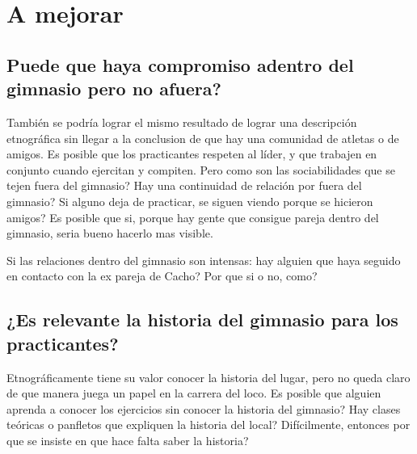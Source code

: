 
\section{A mejorar}\label{a-mejorar}



\subsection{Puede que haya compromiso adentro del gimnasio pero no
afuera?}\label{puede-que-haya-compromiso-adentro-del-gimnasio-pero-no-afuera}

También se podría lograr el mismo resultado de lograr una descripción
etnográfica sin llegar a la conclusion de que hay una comunidad de
atletas o de amigos. Es posible que los practicantes respeten al líder,
y que trabajen en conjunto cuando ejercitan y compiten. Pero como son
las sociabilidades que se tejen fuera del gimnasio? Hay una continuidad
de relación por fuera del gimnasio? Si alguno deja de practicar, se
siguen viendo porque se hicieron amigos? Es posible que si, porque hay
gente que consigue pareja dentro del gimnasio, seria bueno hacerlo mas
visible.

Si las relaciones dentro del gimnasio son intensas: hay alguien que haya
seguido en contacto con la ex pareja de Cacho? Por que si o no, como?

\subsection{¿Es relevante la historia del gimnasio para los
practicantes?}\label{es-relevante-la-historia-del-gimnasio-para-los-practicantes}

Etnográficamente tiene su valor conocer la historia del lugar, pero no
queda claro de que manera juega un papel en la carrera del loco. Es
posible que alguien aprenda a conocer los ejercicios sin conocer la
historia del gimnasio? Hay clases teóricas o panfletos que expliquen la
historia del local? Difícilmente, entonces por que se insiste en que
hace falta saber la historia?

